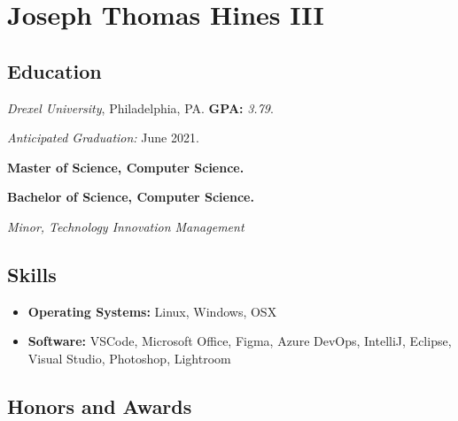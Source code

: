 \documentclass[10pt]{article}
\begin{document}
\section*{\huge Joseph Thomas Hines III}
\label{sec:title}

\begin{multicols}{2}
    \setlength\multicolsep{0pt}

    \subsection*{Education}%
    \label{sub:Education}

    \vspace{-\topsep}
    \emph{Drexel University}, Philadelphia, PA. \textbf{GPA:} \emph{3.79}.

    \emph{Anticipated Graduation:} June 2021.

    \vspace{0.2em}

    \textbf{Master of Science, Computer Science.}

    \textbf{Bachelor of Science, Computer Science.}

    \emph{Minor, Technology Innovation Management}

    \vspace{-\topsep}
    \subsection*{Skills}%
    \label{sub:Skills}

    \vspace{-\topsep}
    \begin{itemize}[leftmargin=*,noitemsep,topsep=0pt]
        \item \textbf{Operating Systems:} Linux, Windows, OSX
        \item \textbf{Software:} VSCode, Microsoft Office, Figma, Azure DevOps,
            IntelliJ, Eclipse, Visual Studio, Photoshop, Lightroom
    \end{itemize}

    \vfill\null
    \columnbreak

    \subsection*{Honors and Awards}%
    \label{sub:Honors and Awards}


\end{multicols}
\end{document}
